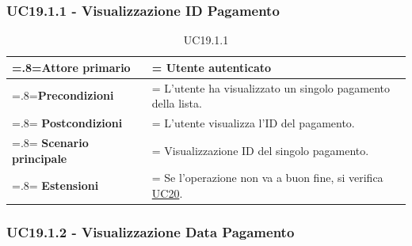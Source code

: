         \subsubsection{UC19.1.1 - Visualizzazione ID Pagamento}
        \label{UC19.1.1}

            \begin{table}[H]
                \centering
                \renewcommand{\arraystretch}{1.8}
                \renewcommand\tabularxcolumn[1]{m{#1}}
                \begin{tabularx}{0.9\textwidth} {
                    >{\hsize=.8\hsize\linewidth=\hsize}X
                    >{\hsize=1.2\hsize\linewidth=\hsize}X}
                    \hline
                    \textbf{Attore primario} & Utente autenticato \\
                    \hline
                    \textbf{Precondizioni} & L'utente ha visualizzato un singolo pagamento della lista. \\
                    \hline
                    \textbf{Postcondizioni} & L'utente visualizza l'ID del pagamento. \\
                    \hline
                    \textbf{Scenario principale} & Visualizzazione ID del singolo pagamento. \\
                    \hline
                    \textbf{Estensioni} & Se l'operazione non va a buon fine, si verifica \hyperref[UC20]{UC20}. \\
                    \hline
                \end{tabularx}
                \caption{UC19.1.1}
            \end{table}

        \subsubsection{UC19.1.2 - Visualizzazione Data Pagamento}
        \label{UC19.1.2}

